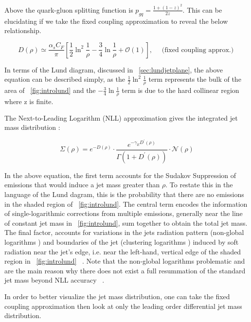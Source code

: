 Above the quark-gluon splitting function is $p_{g q}=\frac{1+(1-z)^{2}}{2 z}$. This can be elucidating if we take the fixed coupling approximation to reveal the below relationship.~\cite{mmdt}


\begin{equation}
D(\rho) \simeq \frac{\alpha_{s} C_{F}}{\pi}\left[\frac{1}{2} \ln ^{2} \frac{1}{\rho}-\frac{3}{4} \ln \frac{1}{\rho}+\mathcal{O}(1)\right], \quad \text { (fixed coupling approx.) }
\end{equation}

In terms of the Lund diagram, discussed in ~\ref{sec:lundjetplane}, the above equation can be described simply, as the $\frac{1}{2} \ln ^{2} \frac{1}{\rho}$ term represents the bulk of the area of ~\ref{fig:introlund} and the $-\frac{3}{4} \ln \frac{1}{\rho}$ term is due to the hard collinear region where z is finite.


The Next-to-Leading Logarithm (NLL) approximation gives the integrated jet mass distribution :\newline


\begin{equation}
\Sigma(\rho)=e^{-D(\rho)} \cdot \frac{e^{-\gamma_{E} D^{\prime}(\rho)}}{\Gamma\left(1+D^{\prime}(\rho)\right)} \cdot \mathcal{N}(\rho)
\end{equation}

In the above equation, the first term accounts for the Sudakov Suppression of emissions that would induce a jet mass greater than $\rho$. To restate this in the language of the Lund dagram, this is the probability that there are no emissions in the shaded region of ~\ref{fig:introlund}. The central term encodes the information of single-logarithmic corrections from multiple emissions, generally near the line of constant jet mass in ~\ref{fig:introlund}, sum together to obtain the total jet mass. The final factor, accounts for variations in the jets radiation pattern (non-global logarithms ) and boundaries of the jet (clustering logarithms ) induced by soft radiation near the jet’s edge, i.e. near the left-hand, vertical edge of the shaded region in  ~\ref{fig:introlund} ~\cite{mmdt}. Note that the non-global logarithms problematic and are the main reason why there does not exist a full resummation of the standard jet mass beyond NLL accuracy ~\cite{mmdt}.


In order to better visualize the jet mass distribution, one can take the fixed coupling approximation then look at only the leading order differential jet mass distribution.~\cite{mmdt}

